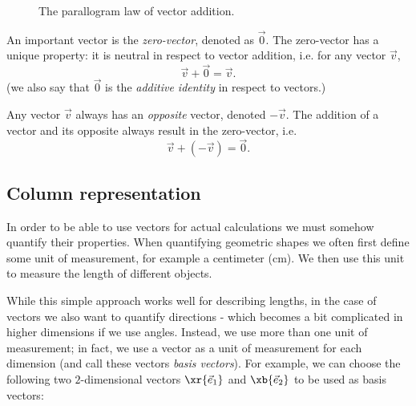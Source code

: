 \begin{figure}[h]
	\centering
	\caption{The parallogram law of vector addition.}
	\label{fig:parallelogram}
\end{figure}

An important vector is the \emph{zero-vector}, denoted as $\vec{0}$. The zero-vector has a unique property: it is neutral in respect to vector addition, i.e. for any vector $\vec{v}$,
\begin{equation}
	\vec{v} + \vec{0} = \vec{v}.
	\label{eq:zero-vector}
\end{equation}
(we also say that $\vec{0}$ is the \emph{additive identity} in respect to vectors.)

Any vector $\vec{v}$ always has an \emph{opposite} vector, denoted $-\vec{v}$. The addition of a vector and its opposite always result in the zero-vector, i.e.
\begin{equation}
	\vec{v} + \left( -\vec{v} \right) = \vec{0}.
	\label{eq:opposite vector}
\end{equation}

\subsection{Column representation}
In order to be able to use vectors for actual calculations we must somehow quantify their properties. When quantifying geometric shapes we often first define some unit of measurement, for example a centimeter (\si{cm}). We then use this unit to measure the length of different objects.

While this simple approach works well for describing lengths, in the case of vectors we also want to quantify directions - which becomes a bit complicated in higher dimensions if we use angles. Instead, we use more than one unit of measurement; in fact, we use a vector as a unit of measurement for each dimension (and call these vectors \emph{basis vectors}). For example, we can choose the following two $2$-dimensional vectors $\xr{\vec{e}_{1}}$ and $\xb{\vec{e}_{2}}$ to be used as basis vectors:

\begin{center}
\end{center}

